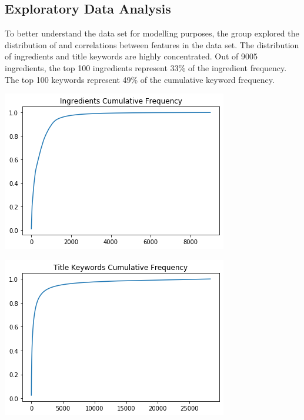 \documentclass[sigconf]{acmart}
\begin{document}
\subsection{Exploratory Data Analysis}
To better understand the data set for modelling purposes, the group explored the distribution of and correlations between features in the data set. The distribution of ingredients and title keywords are highly concentrated. Out of 9005 ingredients, the top 100 ingredients represent 33\% of the ingredient frequency. The top 100 keywords represent 49\% of the cumulative keyword frequency. 

\includegraphics[width=\linewidth]{ingfreq.png}


\includegraphics[width=\linewidth]{titfreq.png}
\end{document}
